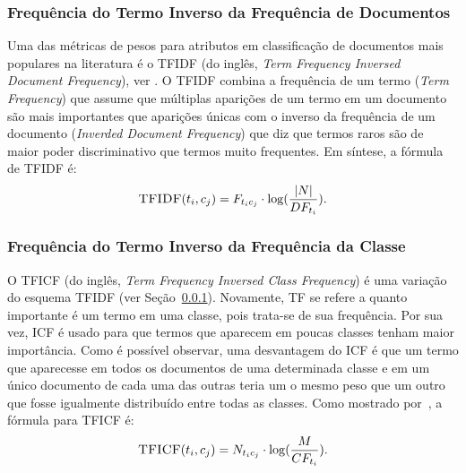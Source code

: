 
\subsubsection{Frequência do Termo Inverso da Frequência de Documentos}%
\label{subsubsection::tfidf}

Uma das métricas de pesos para atributos em classificação de documentos mais populares na literatura é o \textsc{TFIDF} (do inglês, \textit{Term Frequency Inversed Document Frequency}), ver \cite{Salton88}. O \textsc{TFIDF} combina a frequência de um termo (\textit{Term Frequency}) que assume que múltiplas aparições de um termo em um documento são mais importantes que aparições únicas com o inverso da frequência de um documento (\textit{Inverded Document Frequency}) que diz que termos raros são de maior poder discriminativo que termos muito frequentes. Em síntese, a fórmula de \textsc{TFIDF} é:
\begin{equation}\label{eqn::tficf}
 \textsc{TFIDF}(t_i, c_j) =  F_{t_ic_j} \cdot \log( \frac{|N|} {DF_{t_i}} ).
\end{equation}

\subsubsection{Frequência do Termo Inverso da Frequência da Classe}%
\label{subsubsection::tficf}

O \textsc{TFICF} (do inglês, \textit{Term Frequency Inversed Class Frequency}) é uma variação do esquema \textsc{TFIDF} (ver Seção~\ref{subsubsection::tfidf}). Novamente, \textsc{TF} se refere a quanto importante é um termo em uma classe, pois trata-se de sua frequência. Por sua vez, \textsc{ICF} é usado para que termos que aparecem em poucas classes tenham maior importância.
Como é possível observar, uma desvantagem do \textsc{ICF} é que um termo que aparecesse em todos os documentos de uma determinada classe e em um único documento de cada uma das outras teria um o mesmo peso que um outro que fosse igualmente distribuído entre todas as classes. 
Como mostrado por~\cite{ChihHow04}, a fórmula para \textsc{TFICF} é:
\begin{equation}\label{eqn::tficf}
 \textsc{TFICF}(t_i, c_j) = N_{t_ic_j} \cdot \log( \frac{M}{CF_{t_i}} ).
\end{equation}

